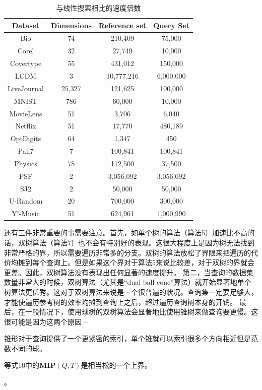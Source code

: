 \documentclass[twocolumn]{article}
\begin{document}
\begin{table}[]
\centering
\begin{tabular}{|c|c|c|c|}
\hline
Dataset     & Dimensions & Reference set & Query Set \\
\hline
Bio         & 74         & 210,409       & 75,000    \\
\hline
Corel       & 32         & 27,749        & 10,000    \\
\hline
Covertype   & 55         & 431,012       & 150,000   \\
\hline
LCDM        & 3          & 10,777,216    & 6,000,000 \\
\hline
LiveJournal & 25,327     & 121,625       & 100,000   \\
\hline
MNIST       & 786        & 60,000        & 10,000    \\
\hline
MovieLens   & 51         & 3,706         & 6,040     \\
\hline
Netflix     & 51         & 17,770        & 480,189   \\
\hline
OptDigits   & 64         & 1,347         & 450       \\
\hline
Pall7       & 7          & 100,841       & 100,841   \\
\hline
Physics     & 78         & 112,500       & 37,500    \\
\hline
PSF         & 2          & 3,056,092     & 3,056,092 \\
\hline
SJ2         & 2          & 50,000        & 50,000    \\
\hline
U-Random    & 20         & 700,000       & 300,000   \\
\hline
Y!-Music    & 51         & 624,961       & 1,000,990 \\
\hline
\end{tabular}
\caption{与线性搜索相比的速度倍数}
\label{my-label}
\end{table}

还有三件非常重要的事需要注意。首先，如单个树的算法（算法5）加速比不高的话，双树算法（算法7）也不会有特别好的表现。这很大程度上是因为树无法找到非常严格的界，所以需要遍历非常多的分支。双树的算法放松了界限来把遍历的代价均摊到每个查询上。但是如果这个界对于算法5来说比较差，对于双树的界就会更差。因此，双树算法没有表现出任何显著的速度提升。
第二，当查询的数据集数量非常大的时候，双树算法（尤其是“dual ball-cone”算法）就开始显著地单个树算法更优秀。这对于双树算法来说是一个很普遍的状况。查询集一定要足够大，才能使遍历参考树的效率均摊到查询上之后，超过遍历查询树本身的开销。
最后，在一般情况下，使用球树的双树算法会显著地比使用锥树来做查询要更慢。这很可能是因为这两个原因 --
\begin{enumerate*}[label={\roman*}]
\item 锥形对于查询提供了一个更紧密的索引，单个锥就可以索引很多个方向相近但是范数不同的球。
\item 等式10中的$\mathbf{MIP}(Q,T)$是相当松的一个上界。
\end{enumerate*}。
\end{document}
